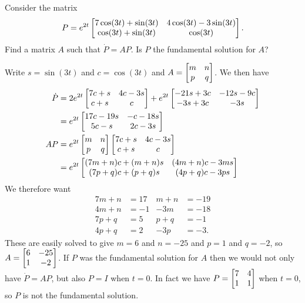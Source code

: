\documentclass[a4paper]{amsart}
\begin{document}
\begin{exercise}\label{ex-fundamental-b}
 Consider the matrix 
 \[ P = e^{2t} \left[\begin{matrix} 
       7\cos(3t) + \sin(3t) & 4\cos(3t) - 3\sin(3t) \\
        \cos(3t) + \sin(3t) & \cos(3t)
      \end{matrix}\right].
 \]
 Find a matrix $A$ such that $\dot{P}=AP$.  Is $P$ the fundamental
 solution for $A$?
\end{exercise}
\begin{solution}
 Write $s=\sin(3t)$ and $c=\cos(3t)$ and $A=\left[\begin{matrix} m&n\\p&q\end{matrix}\right]$.  We then have
 \begin{align*}
    \dot{P}
     &= 2e^{2t} \left[\begin{matrix} 7c+s & 4c-3s \\ c+s & c \end{matrix}\right] + 
         e^{2t} \left[\begin{matrix} -21s+3c & -12s-9c \\ -3s+3c & -3s \end{matrix}\right] \\
     &=  e^{2t} \left[\begin{matrix} 17c -19s & -c-18s \\ 5c-s & 2c-3s \end{matrix}\right]  \\
    AP &= e^{2t}\left[\begin{matrix} m&n\\p&q\end{matrix}\right]
            \left[\begin{matrix} 7c+s & 4c-3s \\ c+s & c \end{matrix}\right] \\
     &= e^{2t} \left[\begin{matrix} (7m+n)c+(m+n)s & (4m+n)c-3ms \\
                    (7p+q)c+(p+q)s & (4p+q)c-3ps \end{matrix}\right] 
 \end{align*}
 We therefore want 
 \begin{align*}
    7m+n &= 17 & m+n &= -19 \\
    4m+n &= -1 & -3m &= -18 \\
    7p+q &=  5 & p+q &=  -1 \\
    4p+q &=  2 & -3p &=  -3.
 \end{align*}
 These are easily solved to give $m=6$ and $n=-25$ and $p=1$ and
 $q=-2$, so $A=\left[\begin{matrix} 6&-25 \\ 1&-2\end{matrix}\right]$.  If $P$ was the fundamental
 solution for $A$ then we would not only have $\dot{P}=AP$, but also
 $P=I$ when $t=0$.  In fact we have $P=\left[\begin{matrix} 7&4\\1&1\end{matrix}\right]$ when
 $t=0$, so $P$ is not the fundamental solution.
\end{solution}
\end{document}
